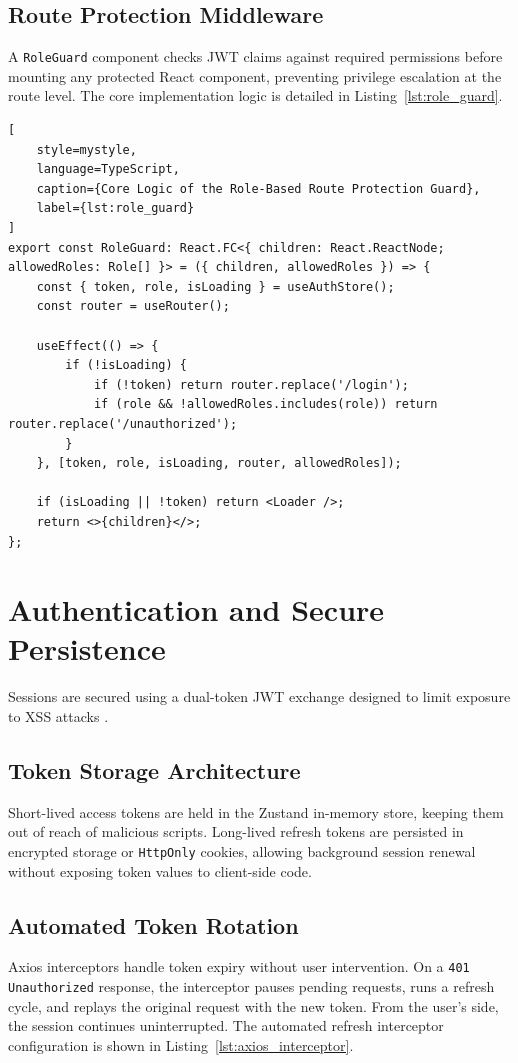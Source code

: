 \subsection{Route Protection Middleware}
A \texttt{RoleGuard} component checks JWT claims against required permissions before mounting any protected React component, preventing privilege escalation at the route level. The core implementation logic is detailed in Listing~\ref{lst:role_guard}.

\begin{lstlisting}[
    style=mystyle,
    language=TypeScript,
    caption={Core Logic of the Role-Based Route Protection Guard},
    label={lst:role_guard}
]
export const RoleGuard: React.FC<{ children: React.ReactNode; allowedRoles: Role[] }> = ({ children, allowedRoles }) => {
    const { token, role, isLoading } = useAuthStore();
    const router = useRouter();

    useEffect(() => {
        if (!isLoading) {
            if (!token) return router.replace('/login');
            if (role && !allowedRoles.includes(role)) return router.replace('/unauthorized');
        }
    }, [token, role, isLoading, router, allowedRoles]);

    if (isLoading || !token) return <Loader />;
    return <>{children}</>;
};
\end{lstlisting}

\section{Authentication and Secure Persistence}
\label{sec:authentication}

Sessions are secured using a dual-token JWT exchange designed to limit exposure to XSS attacks \cite{masue2024quantifying}.

\subsection{Token Storage Architecture}
Short-lived access tokens are held in the Zustand in-memory store, keeping them out of reach of malicious scripts. Long-lived refresh tokens are persisted in encrypted storage or \texttt{HttpOnly} cookies, allowing background session renewal without exposing token values to client-side code.

\subsection{Automated Token Rotation}
Axios interceptors handle token expiry without user intervention. On a \texttt{401 Unauthorized} response, the interceptor pauses pending requests, runs a refresh cycle, and replays the original request with the new token. From the user's side, the session continues uninterrupted. The automated refresh interceptor configuration is shown in Listing~\ref{lst:axios_interceptor}.

